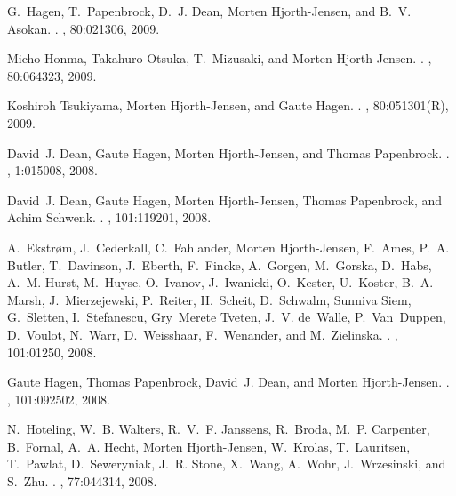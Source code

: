 \begin{thebibliography}{200}
G.~Hagen, T.~Papenbrock, D.~J. Dean, Morten Hjorth-Jensen, and B.~V. Asokan.
.
, 80:021306, 2009.

Micho Honma, Takahuro Otsuka, T.~Mizusaki, and Morten Hjorth-Jensen.
.
, 80:064323, 2009.

Koshiroh Tsukiyama, Morten Hjorth-Jensen, and Gaute Hagen.
.
, 80:051301(R), 2009.

David~J. Dean, Gaute Hagen, Morten Hjorth-Jensen, and Thomas Papenbrock.
.
, 1:015008, 2008.

David~J. Dean, Gaute Hagen, Morten Hjorth-Jensen, Thomas Papenbrock, and Achim
  Schwenk.
.
, 101:119201, 2008.

A.~Ekstr\o{}m, J.~Cederkall, C.~Fahlander, Morten Hjorth-Jensen, F.~Ames, P.~A.
  Butler, T.~Davinson, J.~Eberth, F.~Fincke, A.~Gorgen, M.~Gorska, D.~Habs,
  A.~M. Hurst, M.~Huyse, O.~Ivanov, J.~Iwanicki, O.~Kester, U.~Koster, B.~A.
  Marsh, J.~Mierzejewski, P.~Reiter, H.~Scheit, D.~Schwalm, Sunniva Siem,
  G.~Sletten, I.~Stefanescu, Gry~Merete Tveten, J.~V. de~Walle, P.~Van~Duppen,
  D.~Voulot, N.~Warr, D.~Weisshaar, F.~Wenander, and M.~Zielinska.
.
, 101:01250, 2008.

Gaute Hagen, Thomas Papenbrock, David~J. Dean, and Morten Hjorth-Jensen.
.
, 101:092502, 2008.

N.~Hoteling, W.~B. Walters, R.~V.~F. Janssens, R.~Broda, M.~P. Carpenter,
  B.~Fornal, A.~A. Hecht, Morten Hjorth-Jensen, W.~Krolas, T.~Lauritsen,
  T.~Pawlat, D.~Seweryniak, J.~R. Stone, X.~Wang, A.~Wohr, J.~Wrzesinski, and
  S.~Zhu.
.
, 77:044314, 2008.




\end{thebibliography}
